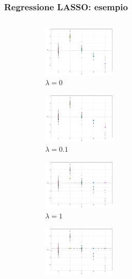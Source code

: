 \documentclass[pdf, aspectratio=169]{beamer}\usepackage[]{graphicx}\usepackage[]{color}
\theoremstyle{definition}
\begin{document}
\begin{frame}
\frametitle{Regressione LASSO: esempio}

\fontsize{9pt}{11pt}\selectfont

\begin{columns}[c]
\begin{column}{0.55\linewidth}
  \begin{figure}
    \centering
    \begin{subfigure}[b]{3cm}
      \centering
      \includegraphics[width=3.5cm]{_bookdown_files/_main_files/figure-latex/lasso-lambda-1.pdf}
      \caption{$\lambda = 0$}
    \end{subfigure}
    \qquad
    \begin{subfigure}[b]{3cm}
      \centering
      \includegraphics[width=3.5cm]{_bookdown_files/_main_files/figure-latex/lasso-lambda-2.pdf}
      \caption{$\lambda = 0.1$}
    \end{subfigure}
    \par\medskip
    \begin{subfigure}[b]{3cm}
      \centering
      \includegraphics[width=3.5cm]{_bookdown_files/_main_files/figure-latex/lasso-lambda-3.pdf}
      \caption{$\lambda = 1$}
    \end{subfigure}
    \qquad
    \begin{subfigure}[b]{3cm}
      \centering
      \includegraphics[width=3.5cm]{_bookdown_files/_main_files/figure-latex/lasso-lambda-4.pdf}

\end{subfigure}
\end{figure}
\end{column}
\end{columns}
\end{frame}
\end{document}

